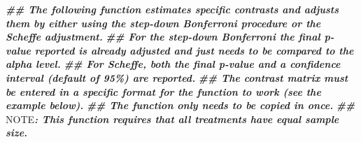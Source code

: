 \documentclass[
]{book}
\newenvironment{Shaded}{\begin{snugshade}}{\end{snugshade}}
\newcommand{\AlertTok}[1]{\textcolor[rgb]{0.94,0.16,0.16}{#1}}
\newcommand{\DocumentationTok}[1]{\textcolor[rgb]{0.56,0.35,0.01}{\textbf{\textit{#1}}}}
\begin{document}
\begin{Shaded}
\begin{Highlighting}[]
\DocumentationTok{\#\# The following function estimates specific contrasts and adjusts them by either using the step{-}down Bonferroni procedure or the Scheffe adjustment.  }
\DocumentationTok{\#\# For the step{-}down Bonferroni the final p{-}value reported is already adjusted and just needs to be compared to the alpha level.}
\DocumentationTok{\#\#  For Scheffe, both the final p{-}value and a confidence interval (default of 95\%) are reported. }
\DocumentationTok{\#\# The contrast matrix must be entered in a specific format for the function to work (see the example below).}
\DocumentationTok{\#\# The function only needs to be copied in once.}
\DocumentationTok{\#\# }\AlertTok{NOTE}\DocumentationTok{:  This function requires that all treatments have equal sample size.}


\end{Highlighting}
\end{Shaded}
\end{document}
